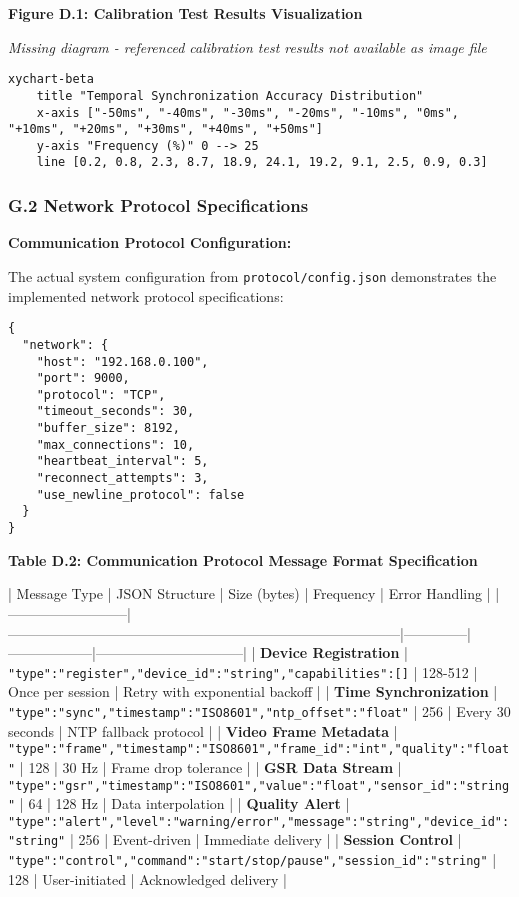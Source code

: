 \documentclass[11pt,a4paper]{article}
\begin{document}
\textbf{Figure D.1: Calibration Test Results Visualization}

\textit{Missing diagram - referenced calibration test results not available as image file}

\begin{verbatim}
xychart-beta
    title "Temporal Synchronization Accuracy Distribution"
    x-axis ["-50ms", "-40ms", "-30ms", "-20ms", "-10ms", "0ms", "+10ms", "+20ms", "+30ms", "+40ms", "+50ms"]
    y-axis "Frequency (%)" 0 --> 25
    line [0.2, 0.8, 2.3, 8.7, 18.9, 24.1, 19.2, 9.1, 2.5, 0.9, 0.3]
\end{verbatim}

\subsubsection{G.2 Network Protocol Specifications}

\textbf{Communication Protocol Configuration:}

The actual system configuration from \texttt{protocol/config.json} demonstrates the implemented network protocol
specifications:

\begin{verbatim}
{
  "network": {
    "host": "192.168.0.100",
    "port": 9000,
    "protocol": "TCP",
    "timeout_seconds": 30,
    "buffer_size": 8192,
    "max_connections": 10,
    "heartbeat_interval": 5,
    "reconnect_attempts": 3,
    "use_newline_protocol": false
  }
}
\end{verbatim}

\textbf{Table D.2: Communication Protocol Message Format Specification}

| Message Type             | JSON Structure                                                                     | Size (bytes) | Frequency        | Error Handling                 |
|--------------------------|------------------------------------------------------------------------------------|--------------|------------------|--------------------------------|
| \textbf{Device Registration}  | \texttt{{"type":"register","device\_id":"string","capabilities":[]}}                       | 128-512      | Once per session | Retry with exponential backoff |
| \textbf{Time Synchronization} | \texttt{{"type":"sync","timestamp":"ISO8601","ntp\_offset":"float"}}                       | 256          | Every 30 seconds | NTP fallback protocol          |
| \textbf{Video Frame Metadata} | \texttt{{"type":"frame","timestamp":"ISO8601","frame\_id":"int","quality":"float"}}        | 128          | 30 Hz            | Frame drop tolerance           |
| \textbf{GSR Data Stream}      | \texttt{{"type":"gsr","timestamp":"ISO8601","value":"float","sensor\_id":"string"}}        | 64           | 128 Hz           | Data interpolation             |
| \textbf{Quality Alert}        | \texttt{{"type":"alert","level":"warning/error","message":"string","device\_id":"string"}} | 256          | Event-driven     | Immediate delivery             |
| \textbf{Session Control}      | \texttt{{"type":"control","command":"start/stop/pause","session\_id":"string"}}            | 128          | User-initiated   | Acknowledged delivery          |
\end{document}
